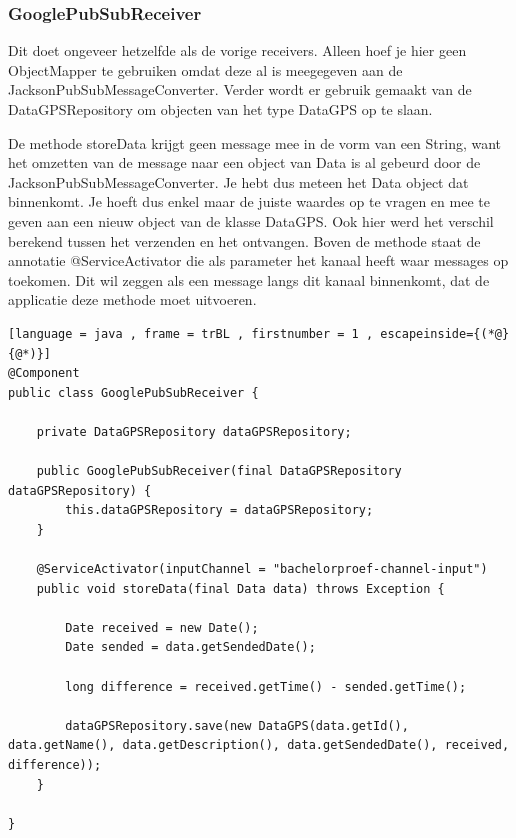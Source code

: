 \subsubsection{GooglePubSubReceiver}
Dit doet ongeveer hetzelfde als de vorige receivers. Alleen hoef je hier geen ObjectMapper te gebruiken omdat deze al is meegegeven aan de JacksonPubSubMessageConverter. Verder wordt er gebruik gemaakt van de DataGPSRepository om objecten van het type DataGPS op te slaan. 

De methode storeData krijgt geen message mee in de vorm van een String, want het omzetten van de message naar een object van Data is al gebeurd door de JacksonPubSubMessageConverter. Je hebt dus meteen het Data object dat binnenkomt. Je hoeft dus enkel maar de juiste waardes op te vragen en mee te geven aan een nieuw object van de klasse DataGPS. Ook hier werd het verschil berekend tussen het verzenden en het ontvangen. Boven de methode staat de annotatie @ServiceActivator die als parameter het kanaal heeft waar messages op toekomen. Dit wil zeggen als een message langs dit kanaal binnenkomt, dat de applicatie deze methode moet uitvoeren.
\begin{lstlisting}[language = java , frame = trBL , firstnumber = 1 , escapeinside={(*@}{@*)}]
@Component
public class GooglePubSubReceiver {

    private DataGPSRepository dataGPSRepository;

    public GooglePubSubReceiver(final DataGPSRepository dataGPSRepository) {
        this.dataGPSRepository = dataGPSRepository;
    }

    @ServiceActivator(inputChannel = "bachelorproef-channel-input")
    public void storeData(final Data data) throws Exception {
       
        Date received = new Date();
        Date sended = data.getSendedDate();

        long difference = received.getTime() - sended.getTime();

        dataGPSRepository.save(new DataGPS(data.getId(), data.getName(), data.getDescription(), data.getSendedDate(), received, difference));
    }

}
\end{lstlisting}



